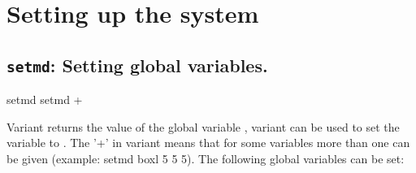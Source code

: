 %  
%   
%  
%  
%
\chapter{Setting up the system}
\label{chap:setup}

\section{\texttt{setmd}: Setting global variables.}

\begin{essyntax}
 setmd 
 setmd  +
\end{essyntax}

Variant  returns the value of the \es global variable
, variant  can be used to set the variable
 to . The '+' in variant  means
that for some variables more than one  can be given
(example: setmd boxl 5 5 5). The following global variables can be
set:

\newenvironment{globvar}{
  \begin{list}{}{
      \setlength{\rightmargin}{1em}
      \setlength{\leftmargin}{2em}
      \setlength{\partopsep}{0pt}
      \setlength{\topsep}{1ex}
      \setlength{\parsep}{0.5ex}
      \setlength{\listparindent}{-1em}
      \setlength{\labelwidth}{0.5em}
      \setlength{\labelsep}{0.5em}
      \renewcommand{\makelabel}[1]{%
        \index{##1@\texttt{##1} (global variable)|mainindex}%
        \index{global variables!\texttt{##1}|mainindex}%
        \texttt{##1}%
      }
    }
  }{
  \end{list}
}
\newcommand{\ro}{\emph{read-only}}

